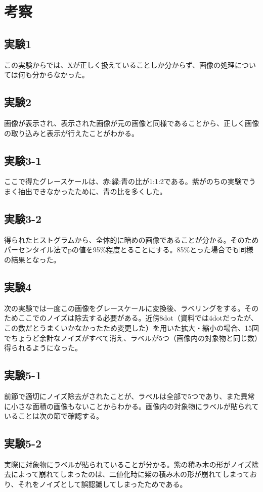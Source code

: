 \documentclass{jarticle}[2012/05/15]
\begin{document}
\pagebreak
\section{考察}
\subsection{実験1}
この実験からでは、Xが正しく扱えていることしか分からず、画像の処理については何も分からなかった。
\subsection{実験2}
画像が表示され、表示された画像が元の画像と同様であることから、正しく画像の取り込みと表示が行えたことがわかる。
\subsection{実験3-1}
ここで得たグレースケールは、赤:緑:青の比が1:1:2である。紫がのちの実験でうまく抽出できなかったために、青の比を多くした。
\subsection{実験3-2}
得られたヒストグラムから、全体的に暗めの画像であることが分かる。そのためパーセンタイル法でpの値を95\%程度とることにする。85\%とった場合でも同様の結果となった。
\subsection{実験4}
次の実験では一度この画像をグレースケールに変換後、ラベリングをする。そのためここでのノイズは除去する必要がある。近傍8dot（資料では4dotだったが、この数だとうまくいかなかったため変更した）を用いた拡大・縮小の場合、15回でちょうど余計なノイズがすべて消え、ラベルが5つ（画像内の対象物と同じ数）得られるようになった。
\subsection{実験5-1}
前節で適切にノイズ除去がされたことが、ラベルは全部で5つであり、また異常に小さな面積の画像もないことからわかる。画像内の対象物にラベルが貼られていることは次の節で確認する。
\subsection{実験5-2}
実際に対象物にラベルが貼られていることが分かる。紫の積み木の形がノイズ除去によって崩れてしまったのは、二値化時に紫の積み木の形が崩れてしまっており、それをノイズとして誤認識してしまったためである。
\end{document}
